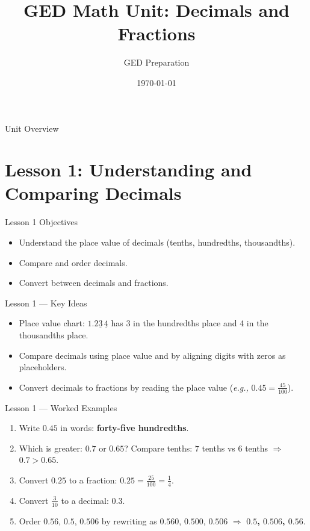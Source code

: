 \documentclass[aspectratio=169]{beamer}
\title{GED Math Unit: Decimals and Fractions}
\author{GED Preparation}
\date{\today}
\begin{document}
\begin{frame}
  \titlepage
\end{frame}

\begin{frame}{Unit Overview}
\tableofcontents
\end{frame}

\section{Lesson 1: Understanding and Comparing Decimals}
\begin{frame}{Lesson 1 Objectives}
\begin{itemize}
  \item Understand the place value of decimals (tenths, hundredths, thousandths).
  \item Compare and order decimals.
  \item Convert between decimals and fractions.
\end{itemize}
\end{frame}

\begin{frame}{Lesson 1 --- Key Ideas}
\begin{itemize}
  \item Place value chart: $1.2\underline{3}\,\underline{4}$ has 3 in the hundredths place and 4 in the thousandths place.
  \item Compare decimals using place value and by aligning digits with zeros as placeholders.
  \item Convert decimals to fractions by reading the place value (\textit{e.g.,} $0.45=\frac{45}{100}$).
\end{itemize}
\end{frame}

\begin{frame}{Lesson 1 --- Worked Examples}
\begin{enumerate}
  \item Write $0.45$ in words: \textbf{forty-five hundredths}.
  \item Which is greater: $0.7$ or $0.65$? \quad Compare tenths: $7$ tenths vs $6$ tenths $\Rightarrow$ \textbf{$0.7>0.65$}.
  \item Convert $0.25$ to a fraction: $0.25=\frac{25}{100}=\frac{1}{4}$.
  \item Convert $\frac{3}{10}$ to a decimal: \textbf{$0.3$}.
  \item Order $0.56$, $0.5$, $0.506$ by rewriting as $0.560$, $0.500$, $0.506$ $\Rightarrow$ \textbf{$0.5$, $0.506$, $0.56$}.
\end{enumerate}
\end{frame}
\end{document}
